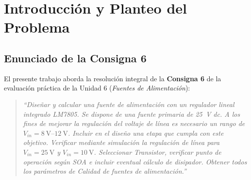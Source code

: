 \section{Introducción y Planteo del Problema}

\subsection{Enunciado de la Consigna 6}
El presente trabajo aborda la resolución integral de la \textbf{Consigna 6} de la evaluación práctica de la Unidad 6 (\emph{Fuentes de Alimentación}):
\begin{quote}
\emph{``Diseñar y calcular una fuente de alimentación con un regulador lineal integrado LM7805. Se dispone de una fuente primaria de \SI{25}{\volt} dc. A los fines de mejorar la regulación del voltaje de línea es necesario un rango de $V_{in} = \SI{8}{\volt}\text{--}\SI{12}{\volt}$. Incluir en el diseño una etapa que cumpla con este objetivo. Verificar mediante simulación la regulación de línea para $V_{in} = \SI{25}{\volt}$ y $V_{in} = \SI{10}{\volt}$. Seleccionar Transistor, verificar punto de operación según SOA e incluir eventual cálculo de disipador. Obtener todos los parámetros de Calidad de fuentes de alimentación.''}
\end{quote}

